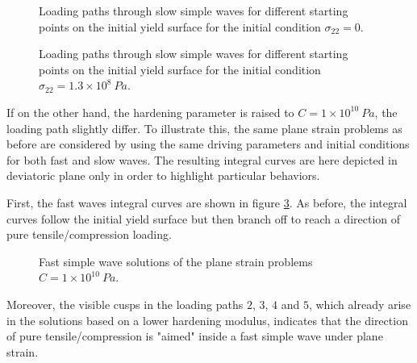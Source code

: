 \begin{figure}[h!]
  \centering
  {}
  {}
  \caption{Loading paths through slow simple waves for different starting points on the initial yield surface for the initial condition $\sigma_{22}=0$.}
  \label{fig:slow_path_plane_strains2}
\end{figure}
\begin{figure}[h!]
  \centering
  {}
  {}
  \caption{Loading paths through slow simple waves for different starting points on the initial yield surface for the initial condition $\sigma_{22}=1.3 \times 10^{8} \: Pa$.}
  \label{fig:slow_path_plane_strains3}
\end{figure}

If on the other hand, the hardening parameter is raised to $C=1\times10^{10} \: Pa$, the loading path slightly differ.
To illustrate this, the same plane strain problems as before are considered by using the same driving parameters and initial conditions for both fast and slow waves.
The resulting integral curves are here depicted in deviatoric plane only in order to highlight particular behaviors.

First, the fast waves integral curves are shown in figure \ref{fig:fast_H}.
As before, the integral curves follow the initial yield surface but then branch off to reach a direction of pure tensile/compression loading.
\begin{figure}[h!]
  \centering
  \caption{Fast simple wave solutions of the plane strain problems $C=1\times10^{10} \: Pa$.}
  \label{fig:fast_H}
\end{figure}
Moreover, the visible cusps in the loading paths $2$, $3$, $4$ and $5$, which already arise in the solutions based on a lower hardening modulus, indicates that the direction of pure tensile/compression is "aimed" inside a fast simple wave under plane strain. 

